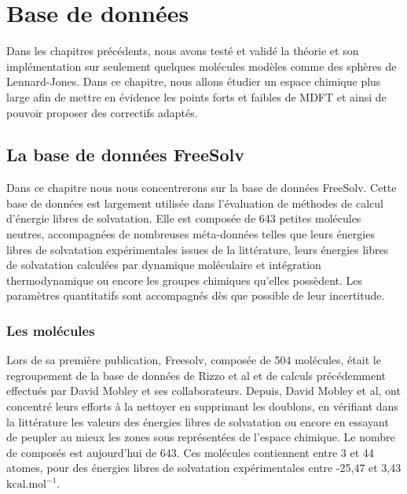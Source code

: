 \chapter{Base de données}
\label{chap:BDD}



Dans les chapitres précédents, nous avons testé et validé la théorie et son implémentation sur seulement quelques molécules modèles comme des sphères de Lennard-Jones. Dans ce chapitre, nous allons étudier un espace chimique plus large afin de mettre en évidence les points forts et faibles de MDFT et ainsi de pouvoir proposer des correctifs adaptés.



\section{La base de données FreeSolv}
Dans ce chapitre nous nous concentrerons sur la base de données FreeSolv\cite{Mobley_small_2009}. Cette base de données est largement utilisée dans l'évaluation de méthodes de calcul d'énergie libres de solvatation. Elle est composée de 643 petites molécules neutres, accompagnées de nombreuses méta-données telles que leurs énergies libres de solvatation expérimentales issues de la littérature, leurs énergies libres de solvatation calculées par dynamique moléculaire et intégration thermodynamique ou encore les groupes chimiques qu'elles possèdent. Les paramètres quantitatifs sont accompagnés dès que possible de leur incertitude.

\subsection{Les molécules}
Lors de sa première publication, Freesolv, composée de 504 molécules, était le regroupement de la base de données de Rizzo et al\cite{Rizzo_estimation_2006} et de calculs précédemment effectués par David Mobley et ses collaborateurs. Depuis, David Mobley et al, ont concentré leurs efforts à la nettoyer\cite{Mobley_small_2009, Mobley_treating_2008, Mobley_comparison_2007, Mobley_predictions_2009, Beckstein_prediction_2011, Mobley_alchemical_2011, Mobley_blind_2014, Mobley_freesolv_2014, DuarteRamosMatos_approaches_2017} en supprimant les doublons, en vérifiant dans la littérature les valeurs des énergies libres de solvatation ou encore en essayant de peupler au mieux les zones sous représentées de l'espace chimique. Le nombre de composés est aujourd'hui de 643. Ces molécules contiennent entre 3 et 44 atomes, pour des énergies libres de solvatation expérimentales entre -25,47 et 3,43 $\mathrm{kcal}.\mathrm{mol}^{-1}$. 

